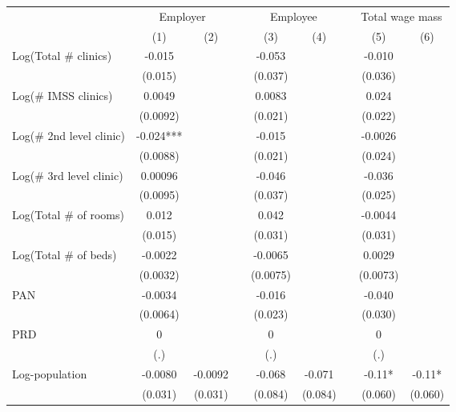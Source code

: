 \begin{tabular}{lcccccccc}
\toprule
      & \multicolumn{2}{c}{Employer} &       & \multicolumn{2}{c}{Employee} &       & \multicolumn{2}{c}{Total wage mass} \\
\cmidrule{2-3}\cmidrule{5-6}\cmidrule{8-9}      & (1)   & (2)   &       & (3)   & (4)   &       & (5)   & (6) \\
\midrule
\midrule
Log(Total \# clinics) & -0.015 &       &       & -0.053 &       &       & -0.010 &  \\
      & (0.015) &       &       & (0.037) &       &       & (0.036) &  \\
Log(\# IMSS clinics) & 0.0049 &       &       & 0.0083 &       &       & 0.024 &  \\
      & (0.0092) &       &       & (0.021) &       &       & (0.022) &  \\
Log(\# 2nd level clinic) & -0.024*** &       &       & -0.015 &       &       & -0.0026 &  \\
      & (0.0088) &       &       & (0.021) &       &       & (0.024) &  \\
Log(\# 3rd level clinic) & 0.00096 &       &       & -0.046 &       &       & -0.036 &  \\
      & (0.0095) &       &       & (0.037) &       &       & (0.025) &  \\
Log(Total \# of rooms) & 0.012 &       &       & 0.042 &       &       & -0.0044 &  \\
      & (0.015) &       &       & (0.031) &       &       & (0.031) &  \\
Log(Total \# of beds) & -0.0022 &       &       & -0.0065 &       &       & 0.0029 &  \\
      & (0.0032) &       &       & (0.0075) &       &       & (0.0073) &  \\
PAN   & -0.0034 &       &       & -0.016 &       &       & -0.040 &  \\
      & (0.0064) &       &       & (0.023) &       &       & (0.030) &  \\
PRD   & 0     &       &       & 0     &       &       & 0     &  \\
      & (.)   &       &       & (.)   &       &       & (.)   &  \\
\midrule
Log-population & -0.0080 & -0.0092 &       & -0.068 & -0.071 &       & -0.11* & -0.11* \\
      & (0.031) & (0.031) &       & (0.084) & (0.084) &       & (0.060) & (0.060) \\

\end{tabular}
